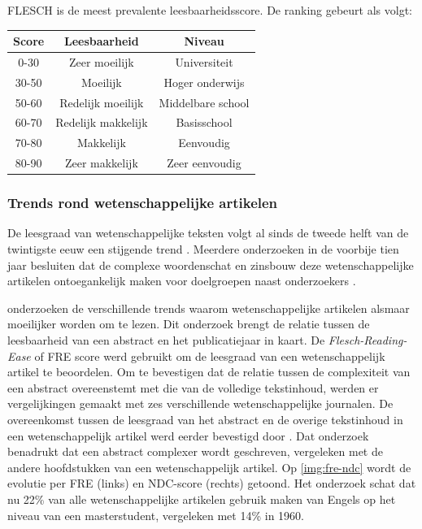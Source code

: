 
FLESCH is de meest prevalente leesbaarheidsscore. De ranking gebeurt als volgt:

\begin{tabular}{|c|c|c|}
	\hline
	\textbf{Score} & \textbf{Leesbaarheid} & \textbf{Niveau} \\
	\hline
	0-30 & Zeer moeilijk & Universiteit \\
	\hline
	30-50 & Moeilijk & Hoger onderwijs \\
	\hline
	50-60 & Redelijk moeilijk & Middelbare school \\
	\hline
	60-70 & Redelijk makkelijk & Basisschool \\
	\hline
	70-80 & Makkelijk & Eenvoudig \\
	\hline
	80-90 & Zeer makkelijk & Zeer eenvoudig \\
	\hline
\end{tabular}


\subsubsection{Trends rond wetenschappelijke artikelen}

De leesgraad van wetenschappelijke teksten volgt al sinds de tweede helft van de twintigste eeuw een stijgende trend \autocite{Hayes1992}. Meerdere onderzoeken in de voorbije tien jaar besluiten dat de complexe woordenschat en zinsbouw deze wetenschappelijke artikelen ontoegankelijk maken voor doelgroepen naast onderzoekers \autocite{Ball2017, PlavenSigray2017, Jones2019}. 

\textcite{PlavenSigray2017} onderzoeken de verschillende trends waarom wetenschappelijke artikelen alsmaar moeilijker worden om te lezen. Dit onderzoek brengt de relatie tussen de leesbaarheid van een abstract en het publicatiejaar in kaart. De \textit{Flesch-Reading-Ease} of FRE score werd gebruikt om de leesgraad van een wetenschappelijk artikel te beoordelen. Om te bevestigen dat de relatie tussen de complexiteit van een abstract overeenstemt met die van de volledige tekstinhoud, werden er vergelijkingen gemaakt met zes verschillende wetenschappelijke journalen. De overeenkomst tussen de leesgraad van het abstract en de overige tekstinhoud in een wetenschappelijk artikel werd eerder bevestigd door \textcite{Dronberger1975}. Dat onderzoek benadrukt dat een abstract complexer wordt geschreven, vergeleken met de andere hoofdstukken van een wetenschappelijk artikel. Op \ref{img:fre-ndc} wordt de evolutie per FRE (links) en NDC-score (rechts) getoond. Het onderzoek schat dat nu 22\% van alle wetenschappelijke artikelen gebruik maken van Engels op het niveau van een masterstudent, vergeleken met 14\% in 1960. 

